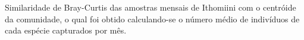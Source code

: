 Similaridade de Bray-Curtis das amostras mensais de Ithomiini com o centróide da comunidade, o qual foi obtido calculando-se o número médio de indivíduos de cada espécie capturados por mês.\label{fig:2.1.5}

